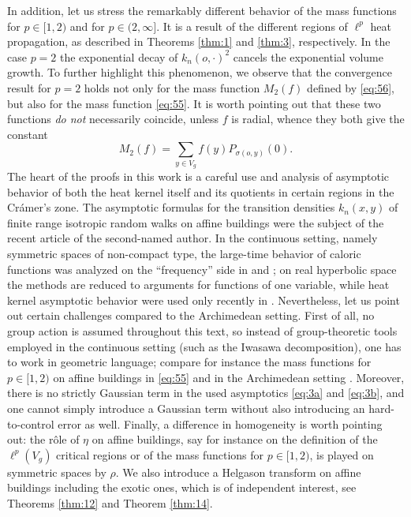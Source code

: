 \documentclass[11pt]{amsart}
\theoremstyle{plain}
\newcounter{thm}
\theoremstyle{definition}
\numberwithin{equation}{section}
\begin{document}
In addition, let us stress the remarkably different behavior of the mass functions for $p \in [1, 2)$ and for 
$p \in (2, \infty]$. It is a result of the different regions of $\ell^p$ heat propagation, as described in Theorems \ref{thm:1} 
and \ref{thm:3}, respectively. In the case $p=2$ the exponential decay of $k_n(o, \cdot)^2$ cancels the exponential volume 
growth. To further highlight this phenomenon, we observe that the convergence result for $p=2$ holds 
not only for the mass function $M_2(f)$ defined by \eqref{eq:56}, but also for the mass function \eqref{eq:55}. It is worth pointing out that these two functions \emph{do not} necessarily coincide, unless $f$ is radial, whence they both give 
the constant 
\[
	M_2(f)=\sum_{y\in V_g} f(y) P_{\sigma(o,y)}(0).
\]
The heart of the proofs in this work is a careful use and analysis of asymptotic behavior of both the heat kernel itself and
its quotients in certain regions in the Cr{\'a}mer's zone. The asymptotic formulas for the transition densities $k_n(x,y)$ of 
finite range isotropic random walks on affine buildings were the subject of the recent article \cite{tr} of the second-named 
author. In the continuous setting, namely symmetric spaces of non-compact type, the large-time behavior of caloric functions 
was analyzed on the ``frequency'' side in \cite{APZ2023} and \cite{NRS24}; on real hyperbolic space \cite{VazHyp} the methods 
are reduced to arguments for functions of one variable, while heat kernel asymptotic behavior were used only recently in 
\cite{P1}. Nevertheless, let us point out certain challenges compared to the Archimedean setting. First of all, no group action 
is assumed throughout this text, so instead of group-theoretic tools employed in the continuous setting (such as the Iwasawa 
decomposition), one has to work in geometric language; compare for instance the mass functions for $p \in [1, 2)$ on affine
buildings in \eqref{eq:55} and in the Archimedean setting \cite{P1}. Moreover, there is no strictly Gaussian term in the used 
asymptotics \eqref{eq:3a} and \eqref{eq:3b}, and one cannot simply introduce a Gaussian term without also introducing an 
hard-to-control error as well. Finally, a difference in homogeneity is worth pointing out: the r\^ole of $\eta$ on affine 
buildings, say for instance on the definition of the $\ell^p(V_g)$ critical regions or of the mass functions for $p \in [1, 2)$, 
is played on symmetric spaces by $\rho$. We also introduce a Helgason transform on affine buildings including the exotic ones,
which is of independent interest, see Theorems \ref{thm:12} and Theorem \ref{thm:14}.
\end{document}
